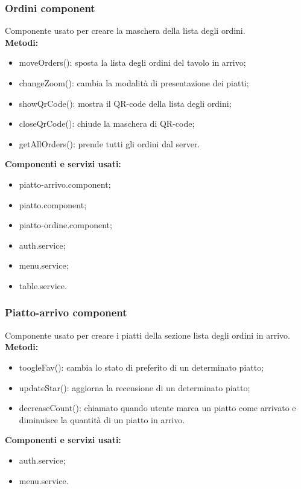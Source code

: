 \subsubsection{Ordini component}
Componente usato per creare la maschera della lista degli ordini.\\
\textbf{Metodi:}
\begin{itemize}
    \item moveOrders(): sposta la lista degli ordini del tavolo in arrivo;
    \item changeZoom(): cambia la modalità di presentazione dei piatti;
    \item showQrCode(): mostra il QR-code della lista degli ordini;
    \item closeQrCode(): chiude la maschera di QR-code;
    \item getAllOrders(): prende tutti gli ordini dal server.
\end{itemize}
\textbf{Componenti e servizi usati:}
\begin{itemize}
    \item piatto-arrivo.component;
    \item piatto.component;
    \item piatto-ordine.component;
    \item auth.service;
    \item menu.service;
    \item table.service.
\end{itemize}

\subsubsection{Piatto-arrivo component}
Componente usato per creare i piatti della sezione lista degli ordini in arrivo.\\
\textbf{Metodi:}
\begin{itemize}
    \item toogleFav(): cambia lo stato di preferito di un determinato piatto;
    \item updateStar(): aggiorna la recensione di un determinato piatto;
    \item decreaseCount(): chiamato quando utente marca un piatto come arrivato e diminuisce la quantità di un piatto in arrivo.
\end{itemize}
\textbf{Componenti e servizi usati:}
\begin{itemize}
    \item auth.service;
    \item menu.service.
\end{itemize}

